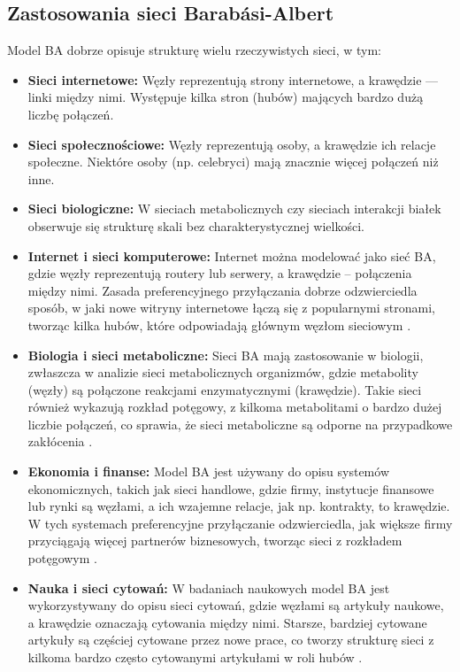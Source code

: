 \subsection{Zastosowania sieci Barabási-Albert}
Model BA dobrze opisuje strukturę wielu rzeczywistych sieci, w tym:
\begin{itemize}
      \item \textbf{Sieci internetowe:} Węzły reprezentują strony internetowe, a krawędzie — linki między nimi. Występuje kilka stron (hubów) mających bardzo dużą liczbę połączeń.
      \item \textbf{Sieci społecznościowe:} Węzły reprezentują osoby, a krawędzie ich relacje społeczne. Niektóre osoby (np. celebryci) mają znacznie więcej połączeń niż inne.
      \item \textbf{Sieci biologiczne:} W sieciach metabolicznych czy sieciach interakcji białek obserwuje się strukturę skali bez charakterystycznej wielkości.

      \item \textbf{Internet i sieci komputerowe:} Internet można modelować jako sieć BA, gdzie węzły reprezentują routery lub serwery, a krawędzie – połączenia między nimi.
            Zasada preferencyjnego przyłączania dobrze odzwierciedla sposób, w jaki nowe witryny internetowe łączą się z popularnymi stronami, tworząc kilka hubów,
            które odpowiadają głównym węzłom sieciowym \cite{Barabasi2003}.

      \item \textbf{Biologia i sieci metaboliczne:} Sieci BA mają zastosowanie w biologii, zwłaszcza w analizie sieci metabolicznych organizmów, gdzie metabolity (węzły) są połączone reakcjami enzymatycznymi (krawędzie).
            Takie sieci również wykazują rozkład potęgowy, z kilkoma metabolitami o bardzo dużej liczbie połączeń, co sprawia, że sieci metaboliczne są odporne na przypadkowe zakłócenia \cite{Jeong2000}.

      \item \textbf{Ekonomia i finanse:} Model BA jest używany do opisu systemów ekonomicznych, takich jak sieci handlowe, gdzie firmy, instytucje finansowe lub rynki są węzłami, a ich wzajemne relacje, jak np. kontrakty, to krawędzie.
            \\ W tych systemach preferencyjne przyłączanie odzwierciedla, jak większe firmy przyciągają więcej partnerów biznesowych, tworząc sieci z rozkładem potęgowym \cite{Battiston2007}.

      \item \textbf{Nauka i sieci cytowań:} W badaniach naukowych model BA jest wykorzystywany do opisu sieci cytowań, gdzie węzłami są artykuły naukowe, a krawędzie oznaczają cytowania między nimi.
            Starsze, bardziej cytowane artykuły są częściej cytowane przez nowe prace, co tworzy strukturę sieci z kilkoma bardzo często cytowanymi artykułami w roli hubów \cite{Price1976}.


\end{itemize}
